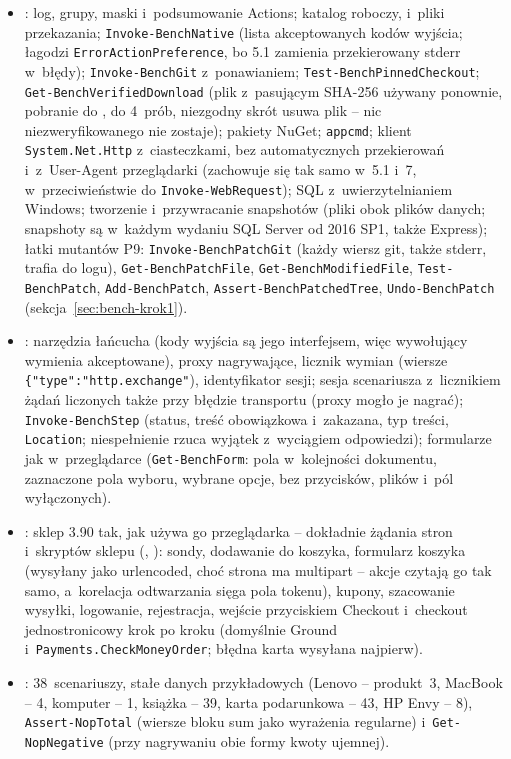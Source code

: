 \begin{itemize}
  \item {}: log, grupy, maski i~podsumowanie Actions; katalog
    roboczy,  i~pliki przekazania; \texttt{Invoke-BenchNative} (lista
    akceptowanych kodów wyjścia; łagodzi \texttt{ErrorActionPreference}, bo 5.1 zamienia
    przekierowany stderr w~błędy); \texttt{Invoke-BenchGit} z~ponawianiem;
    \texttt{Test-BenchPinnedCheckout}; \texttt{Get-BenchVerifiedDownload} (plik z~pasującym
    SHA-256 używany ponownie, pobranie do , do 4~prób, niezgodny skrót
    usuwa plik -- nic niezweryfikowanego nie zostaje); pakiety NuGet; \texttt{appcmd};
    klient \texttt{System.Net.Http} z~ciasteczkami, bez automatycznych przekierowań
    i~z~User-Agent przeglądarki (zachowuje się tak samo w~5.1 i~7, w~przeciwieństwie do
    \texttt{Invoke-WebRequest}); SQL z~uwierzytelnianiem Windows; tworzenie
    i~przywracanie snapshotów (pliki  obok plików danych; snapshoty są w~każdym
    wydaniu SQL Server od 2016 SP1, także Express); łatki mutantów P9:
    \texttt{Invoke-BenchPatchGit} (każdy wiersz git, także stderr, trafia do logu),
    \texttt{Get-BenchPatchFile}, \texttt{Get-BenchModifiedFile}, \texttt{Test-BenchPatch},
    \texttt{Add-BenchPatch}, \texttt{Assert-BenchPatchedTree}, \texttt{Undo-BenchPatch}
    (sekcja~\ref{sec:bench-krok1}).
  \item {}: narzędzia łańcucha (kody wyjścia  są
    jego interfejsem, więc wywołujący wymienia akceptowane), proxy nagrywające, licznik
    wymian (wiersze \texttt{\{"type":"http.exchange"}), identyfikator sesji; sesja
    scenariusza z~licznikiem żądań liczonych także przy błędzie transportu (proxy mogło je
    nagrać); \texttt{Invoke-BenchStep} (status, treść obowiązkowa i~zakazana, typ treści,
    \texttt{Location}; niespełnienie rzuca wyjątek z~wyciągiem odpowiedzi); formularze
    jak w~przeglądarce (\texttt{Get-BenchForm}: pola w~kolejności dokumentu, zaznaczone
    pola wyboru, wybrane opcje, bez przycisków, plików i~pól wyłączonych).
  \item {}: sklep 3.90 tak, jak używa go przeglądarka --
    dokładnie żądania stron i~skryptów sklepu (,
    ): sondy, dodawanie do koszyka, formularz koszyka
    (wysyłany jako urlencoded, choć strona ma multipart -- akcje czytają go tak samo,
    a~korelacja odtwarzania sięga pola tokenu), kupony, szacowanie wysyłki, logowanie,
    rejestracja, wejście przyciskiem Checkout i~checkout jednostronicowy krok po kroku
    (domyślnie Ground i~\texttt{Payments.CheckMoneyOrder}; błędna karta wysyłana
    najpierw).
  \item {}: 38~scenariuszy, stałe danych
    przykładowych (Lenovo -- produkt~3, MacBook -- 4, komputer -- 1, książka -- 39, karta
    podarunkowa -- 43, HP Envy -- 8), \texttt{Assert-NopTotal} (wiersze bloku sum jako
    wyrażenia regularne) i~\texttt{Get-NopNegative} (przy nagrywaniu obie formy kwoty
    ujemnej).
\end{itemize}


